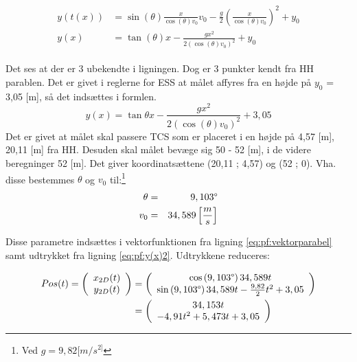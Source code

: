 \begin{align}
\begin{split}
y(t(x)) &= \sin \left( \theta \right) \frac{x}{\cos \left( \theta \right) v_0} v_0 - \frac{g}{2} \left(\frac{x}{\cos \left( \theta \right) v_0}\right)^2 + y_0 \\
y(x) &= \tan \left( \theta \right) x - \frac{gx^2}{2(\cos \left( \theta \right) v_0)^2} + y_0
\label{eq:pf:y(x(t))}
\end{split}
\end{align}

Det ses at der er 3 ubekendte i ligningen. Dog er 3 punkter kendt fra HH parablen. Det er givet i reglerne for ESS at målet affyres fra en højde på \(y_0\) = 3,05 [m], så det indsættes i formlen. 
\begin{equation}
y(x) = \tan \theta x - \frac{gx^2}{2(\cos \left( \theta \right)  v_0)^2} + 3,05
\label{eq:pf:y(x)2}
\end{equation}
Det er givet at målet skal passere TCS som er placeret i en højde på 4,57 [m], 20,11 [m] fra HH. 
Desuden skal målet bevæge sig 50 - 52 [m], i de videre beregninger 52 [m]. Det giver koordinatsættene (20,11 ; 4,57) og (52 ; 0). Vha. disse bestemmes \(\theta\) og \(v_0\) til:\footnote{Ved \(g = 9,82[m/{s}^{2]}\)}
\begin{eqnarray}
\theta &=& 9,103 \degree \\
v_0 &=& 34,589 \left[ \frac { m }{ s }  \right] 
\end{eqnarray}

Disse parametre indsættes i vektorfunktionen fra ligning \ref{eq:pf:vektorparabel} samt udtrykket fra ligning \ref{eq:pf:y(x)2}. Udtrykkene reduceres: 

\begin{align}
\begin{split}
	Pos(t) = \left( \begin{array}{c}
	x_{2D}(t) \\
	y_{2D}(t)
	\end{array}
	\right)
	&= \left( \begin{array}{c}
	\cos \left(9,103 \degree \right) 34,589 t \\
	\sin \left(9,103 \degree \right) 34,589 t - \frac{9,82}{2} t^2 + 3,05
	\end{array}
	\right) \\
	&= \left( \begin{array}{c}
	34,153 t \\
	- 4,91 t^2 + 5,473 t + 3,05
	\end{array}
	\right)
\label{eq:pf:vektorparabel2}
\end{split}
\end{align}

